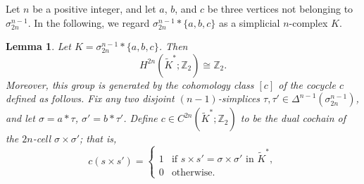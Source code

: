 \documentclass{amsart}
\newtheorem{Lemma}[Theorem]{Lemma}
\theoremstyle{definition}
\theoremstyle{remark}
\numberwithin{equation}{section}
\begin{document}
Let $n$ be a positive integer, and let $a$, $b$, and $c$ be three vertices not belonging to $\sigma_{2n}^{n-1}$. In the following, we regard $\sigma_{2n}^{n-1} * \{a,b,c\}$ as a simplicial $n$-complex $K$.

\begin{Lemma}\label{cohomo}
Let $K = \sigma_{2n}^{n-1} * \{a,b,c\}$. Then 
\[
H^{2n}(\widetilde{K}^*;\mathbb{Z}_2) \cong \mathbb{Z}_2.
\]
Moreover, this group is generated by the cohomology class $[c]$ of the cocycle $c$ defined as follows. Fix any two disjoint $(n-1)$-simplices $\tau, \tau' \in \varDelta^{n-1}(\sigma_{2n}^{n-1})$, and let $\sigma = a*\tau$, $\sigma' = b*\tau'$. Define $c \in C^{2n}(\widetilde{K}^*;\mathbb{Z}_2)$ to be the dual cochain of the $2n$-cell $\sigma \times \sigma'$; that is,
\[
c(s \times s') = 
\begin{cases}
1 & \text{if } s \times s' = \sigma \times \sigma' \text{ in } \widetilde{K}^*, \\
0 & \text{otherwise}.
\end{cases}
\]
\end{Lemma}
\end{document}
